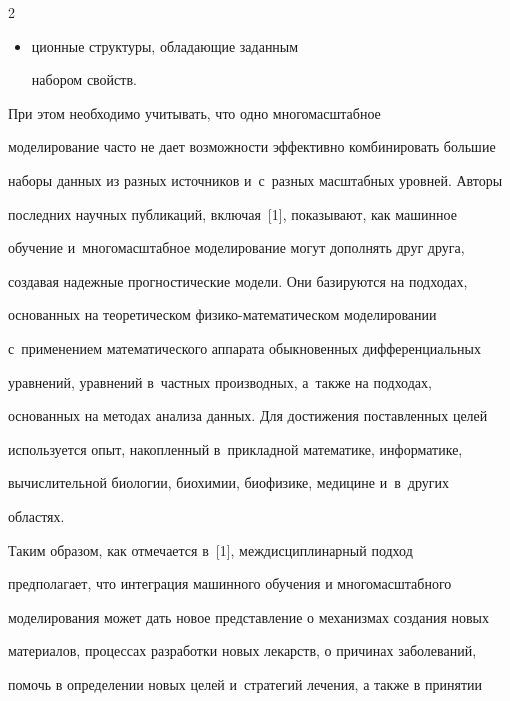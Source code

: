 \begin{multicols}{2}
\pagebreak





\begin{itemize}


\item[ ] 


ционные структуры, обладающие заданным 


набором свойств.


    \end{itemize}


        При этом необходимо учитывать, что одно многомасштабное 


моделирование часто не дает возможности эффективно комбинировать большие 


наборы данных из разных источников и~с~разных \mbox{масштабных} уровней. Авторы 


последних научных пуб\-ли\-ка\-ций, включая~[1], показывают, как машинное 


обучение и~многомасштабное моделирование могут дополнять друг друга, 


создавая надежные прогностические модели. Они базируются на подходах, 


основанных на теоретическом фи\-зи\-ко-ма\-те\-ма\-ти\-че\-ском моделировании 


с~применением \mbox{математического} аппарата обыкновенных дифференциальных 


уравнений, уравнений в~част\-ных производных, а~также на подходах, 


основанных на методах анализа данных. Для достижения поставленных целей 


используется опыт, накопленный в~прикладной математике, информатике, 


вычислительной биологии, биохимии, биофизике, медицине и~в~других 


областях.


    


    Таким образом, как отмечается в~[1], меж\-дис\-цип\-ли\-нар\-ный подход 


предполагает, что интеграция машинного обучения и многомасштабного 


моделирования может дать новое представление о механизмах создания новых 


материалов, процессах разработки новых лекарств, о причинах заболеваний, 


помочь в определении новых целей и~стратегий лечения, а также в принятии 



\end{multicols}
